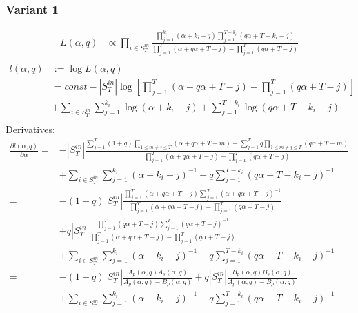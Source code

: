 \documentclass[a4paper, 12pt]{article}
\newcommand{\sint}{|S^{in}_T|}
\begin{document}
\subsubsection{Variant 1}
\begin{align*}
    L(\alpha, q) &\propto \prod_{i \in S_T^{in}} \frac{\prod_{j=1}^{k_i} (\alpha + k_i - j)\prod_{j=1}^{T - k_i} (q\alpha + T - k_i - j)}{\prod_{j=1}^T(\alpha + q\alpha + T - j) - \prod_{j=1}^T (q\alpha + T - j)} \\
\end{align*}
\begin{align} \label{eq:4}
    l(\alpha, q) &:= \log L(\alpha, q) \nonumber \\
    &= const - |S_T^{in}|\log\left[\prod_{j=1}^T(\alpha + q\alpha + T - j) - \prod_{j=1}^T (q\alpha + T - j)\right] \nonumber \\
    &+ \sum_{i \in S_T^{in}} \sum_{j = 1}^{k_i} \log(\alpha + k_i - j) + \sum_{j = 1}^{T - k_i} \log(q\alpha + T - k_i - j) \nonumber \\
\end{align}
Derivatives:
\begin{align} \label{eq:5}
    \frac{\partial l(\alpha, q)}{\partial \alpha} =& -\sint \frac{\sum_{j = 1}^{T} (1 + q) \prod_{1 \leq m \neq j \leq T} (\alpha + q\alpha + T - m) - \sum_{j = 1}^{T} q \prod_{1 \leq m \neq j \leq T} (q\alpha + T - m)}{\prod_{j = 1}^{T} (\alpha + q\alpha + T - j) - \prod_{j=1}^T (q\alpha + T - j)}\nonumber \\
    &+ \sum_{i \in S_T^{in}} \sum_{j = 1}^{k_i} (\alpha + k_i - j)^{-1} + q\sum_{j = 1}^{T - k_i} (q\alpha + T - k_i - j)^{-1} \nonumber \\
    =& -(1 + q)\sint \frac{ \prod_{j = 1}^{T} (\alpha + q\alpha + T - j) \sum_{j = 1}^{T} (\alpha + q\alpha + T - j)^{-1} }{\prod_{j = 1}^{T} (\alpha + q\alpha + T - j) - \prod_{j=1}^T (q\alpha + T - j)} \nonumber \\
    &+ q|S_T^{in}| \frac{\prod_{j = 1}^{T} (q\alpha + T - j) \sum_{j = 1}^{T} (q\alpha + T - j)^{-1}  }{ \prod_{j = 1}^{T} (\alpha + q\alpha + T - j) - \prod_{j=1}^T (q\alpha + T - j)} \nonumber \\
    &+ \sum_{i \in S_T^{in}} \sum_{j = 1}^{k_i} (\alpha + k_i - j)^{-1} + q\sum_{j = 1}^{T - k_i} (q\alpha + T - k_i - j)^{-1} \nonumber \\
    =& -(1 + q)\sint \frac{ A_p(\alpha, q) A_s(\alpha, q) }{A_p(\alpha, q) - B_p(\alpha, q)} + q|S_T^{in}| \frac{B_p(\alpha, q) B_s(\alpha, q)  }{ A_p(\alpha, q) - B_p(\alpha, q)} \nonumber \\
    &+ \sum_{i \in S_T^{in}} \sum_{j = 1}^{k_i} (\alpha + k_i - j)^{-1} + q\sum_{j = 1}^{T - k_i} (q\alpha + T - k_i - j)^{-1} \nonumber \\
\end{align}
\end{document}
